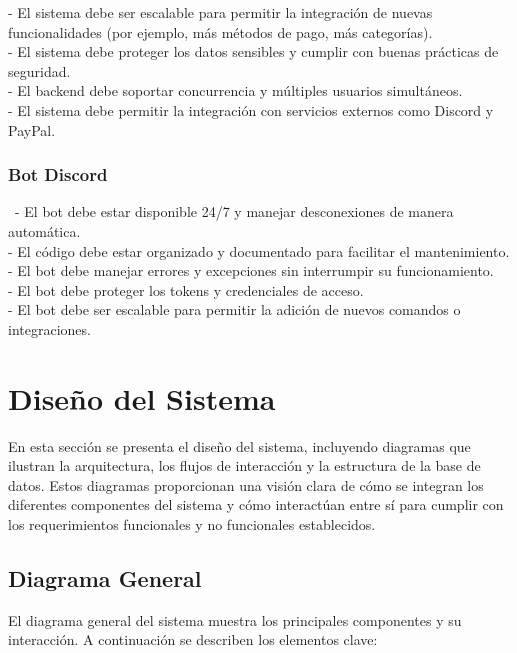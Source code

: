\documentclass[a4paper,12pt]{article}
\begin{document}
- El sistema debe ser escalable para permitir la integración de nuevas funcionalidades (por ejemplo, más métodos de pago, más categorías).\\

- El sistema debe proteger los datos sensibles y cumplir con buenas prácticas de seguridad.\\

- El backend debe soportar concurrencia y múltiples usuarios simultáneos.\\

- El sistema debe permitir la integración con servicios externos como Discord y PayPal.\\

\subsubsection{Bot Discord}\
- El bot debe estar disponible 24/7 y manejar desconexiones de manera automática.\\

- El código debe estar organizado y documentado para facilitar el mantenimiento.\\

- El bot debe manejar errores y excepciones sin interrumpir su funcionamiento.\\

- El bot debe proteger los tokens y credenciales de acceso.\\

- El bot debe ser escalable para permitir la adición de nuevos comandos o integraciones.\\
\newpage

\section{Diseño del Sistema}
En esta sección se presenta el diseño del sistema, incluyendo diagramas que ilustran la arquitectura, los flujos de interacción y la estructura de la base de datos. Estos diagramas proporcionan una visión clara de cómo se integran los diferentes componentes del sistema y cómo interactúan entre sí para cumplir con los requerimientos funcionales y no funcionales establecidos.
\subsection{Diagrama General}

El diagrama general del sistema muestra los principales componentes y su interacción. A continuación se describen los elementos clave:
\end{document}
